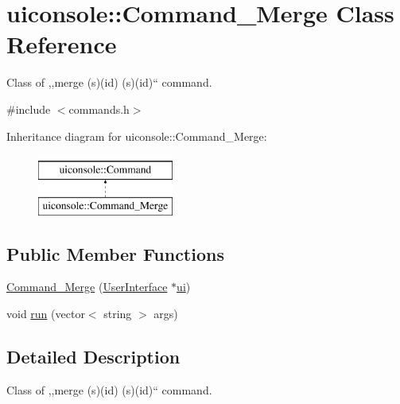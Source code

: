 \hypertarget{classuiconsole_1_1Command__Merge}{
\section{uiconsole::Command\_\-Merge Class Reference}
\label{d8/dc5/classuiconsole_1_1Command__Merge}
}


Class of ,,merge (s)(id) (s)(id)`` command.  




{\ttfamily \#include $<$commands.h$>$}

Inheritance diagram for uiconsole::Command\_\-Merge:\begin{figure}[H]
\begin{center}
\leavevmode
\includegraphics[height=2.000000cm]{d8/dc5/classuiconsole_1_1Command__Merge}
\end{center}
\end{figure}
\subsection*{Public Member Functions}
\begin{DoxyCompactItemize}
\item 
\hyperlink{classuiconsole_1_1Command__Merge_a7d15ac15581529bd9137d7242c798d34}{Command\_\-Merge} (\hyperlink{classUserInterface}{UserInterface} $\ast$\hyperlink{classuiconsole_1_1Command_ab43ed5152860c099f858d62f9f556699}{ui})
\item 
void \hyperlink{classuiconsole_1_1Command__Merge_a5d82c5fab7e1f57b885a00eab2cb87b0}{run} (vector$<$ string $>$ args)
\end{DoxyCompactItemize}


\subsection{Detailed Description}
Class of ,,merge (s)(id) (s)(id)`` command. 

